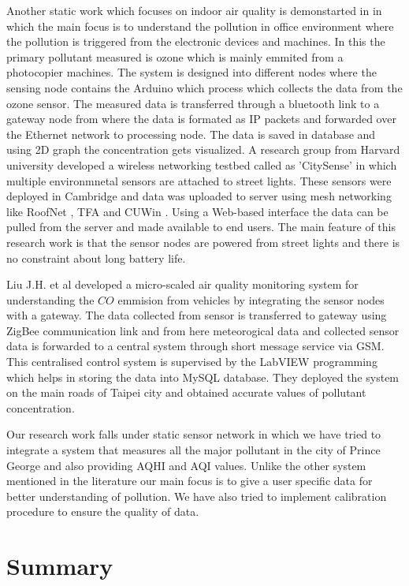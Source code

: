 Another static work which focuses on indoor air quality is demonstarted in \cite{Firdhous2017} in which the main focus is to understand the pollution in office environment where the pollution is triggered from the electronic devices and machines. In this the primary pollutant measured is ozone which is mainly emmited from a photocopier machines. The system is designed into different nodes where the sensing node contains the Arduino which process which collects the data from the ozone sensor. The measured data is transferred through a bluetooth link to a gateway node from where the data is formated as IP packets and forwarded over the Ethernet network to processing node. The data is saved in database and using 2D graph the concentration gets visualized. A research group from Harvard university developed a wireless networking testbed called as 'CitySense' \cite{Murty2008} in which multiple environmnetal sensors are attached to street lights. These sensors were deployed in Cambridge and data was uploaded to server using mesh networking like RoofNet \cite{Bicket2005}, TFA \cite{Camp2006} and CUWin \cite{cuwin2006}. Using a Web-based interface the data can be pulled from the server and made available to end users. The main feature of this research work is that the sensor nodes are powered from street lights and there is no constraint about long battery life.
\par
Liu J.H. et al \cite{Liu2011} developed a micro-scaled air quality monitoring system for understanding the $CO$ emmision from vehicles by integrating the sensor nodes with a gateway. The data collected from sensor is transferred to gateway using ZigBee communication link and from here meteorogical data and collected sensor data is forwarded to a central system through short message service via GSM. This centralised control system is supervised by the LabVIEW \cite{INSTRUMENTS2013} programming which helps in storing the data into MySQL database. They deployed the system on the main roads of Taipei city and obtained accurate values of pollutant concentration.

Our research work falls under static sensor network in which we have tried to integrate a system that measures all the major pollutant in the city of Prince George and also providing AQHI and AQI values. Unlike the other system mentioned in the literature our main focus is to give a user specific data for better understanding of pollution. We have also tried to implement calibration procedure to ensure the quality of data. 

 \section{Summary}


